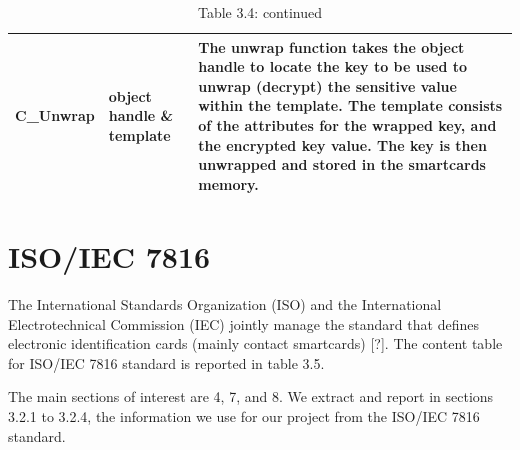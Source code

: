 \documentclass[bsc,frontabs,twoside,singlespacing,parskip,deptreport]{infthesis}     %
\begin{document}
\begin{table}[H]
\begin{tabular}{|l|p{5cm}|p{8cm}|}
\hline
C\_Unwrap & object handle \& template & The unwrap function takes the object handle to locate the key to be used to unwrap (decrypt) the sensitive value within the template. The template consists of the attributes for the wrapped key, and the encrypted key value. The key is then unwrapped and stored in the smartcards memory. \\
\hline
\end{tabular}
\caption*{Table 3.4: continued}
\end{table}

\pagebreak
\section{ISO/IEC 7816}

The International Standards Organization (ISO) and the International Electrotechnical Commission (IEC) jointly manage the standard that defines electronic identification cards (mainly contact smartcards) [?].
The content table for ISO/IEC 7816 standard is reported in table 3.5. 
 
The main sections of interest are 4, 7, and 8. We extract and report in sections 3.2.1 to 3.2.4, the information we use for our project from the ISO/IEC 7816 standard.
\end{document}
